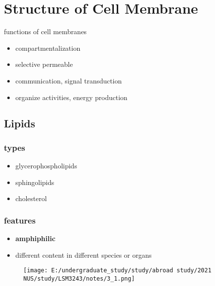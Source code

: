 \chapter{Structure of Cell Membrane}

\begin{introduction}
	\item 
\end{introduction}

\begin{emptytcb*}{functions of cell membranes}{}
	
	\begin{itemize}
		\item
		compartmentalization
		\item
		selective permeable
		\item
		communication, signal transduction
		\item
		organize activities, energy production
	\end{itemize}
\end{emptytcb*}


\hypertarget{lipids}{%
	\section{Lipids}\label{lipids}}

\hypertarget{types}{%
	\subsection{types}\label{types}}

\begin{itemize}
	\item
	glycerophospholipids
	\item
	sphingolipids
	\item
	cholesterol
\end{itemize}
\hypertarget{features}{%
	\subsection{features}\label{features}}

\begin{itemize}
	\item
	\textbf{amphiphilic}
	\item
	different content in different species or organs
\end{itemize}

\begin{figure}
	\centering
	\texttt{[image: E:/undergraduate\_study/study/abroad study/2021 NUS/study/LSM3243/notes/3\_1.png]}
\end{figure}

